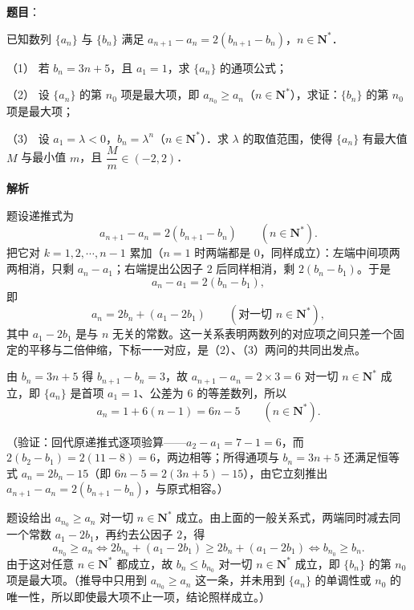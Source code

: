\begin{answer}

\textbf{题目}：

已知数列 \(\{a_{n}\}\) 与 \(\{b_{n}\}\) 满足 \(a_{n+1}-a_{n}=2(b_{n+1}-b_{n})\)，\(n\in\mathbf{N}^{*}\)．

（1） 若 \(b_{n}=3n+5\)，且 \(a_{1}=1\)，求 \(\{a_{n}\}\) 的通项公式；

（2） 设 \(\{a_{n}\}\) 的第 \(n_{0}\) 项是最大项，即 \(a_{n_{0}}\geqslant a_{n}\)（\(n\in\mathbf{N}^{*}\)），求证：\(\{b_{n}\}\) 的第 \(n_{0}\) 项是最大项；

（3） 设 \(a_{1}=\lambda<0\)，\(b_{n}=\lambda^{n}\)（\(n\in\mathbf{N}^{*}\)）．求 \(\lambda\) 的取值范围，使得 \(\{a_{n}\}\) 有最大值 \(M\) 与最小值 \(m\)，且 \(\dfrac{M}{m}\in(-2,2)\)．

\textbf{解析}

题设递推式为
\nopagebreak[4]
\[
a_{n+1}-a_{n}=2(b_{n+1}-b_{n})\qquad(n\in\mathbf{N}^{*}).
\]
把它对 \(k=1,2,\cdots,n-1\) 累加（\(n=1\) 时两端都是 \(0\)，同样成立）：左端中间项两两相消，只剩 \(a_{n}-a_{1}\)；右端提出公因子 \(2\) 后同样相消，剩 \(2(b_{n}-b_{1})\)。于是
\nopagebreak[4]
\[
a_{n}-a_{1}=2(b_{n}-b_{1}),
\]
即
\nopagebreak[4]
\[
a_{n}=2b_{n}+(a_{1}-2b_{1})\qquad(\text{对一切 }n\in\mathbf{N}^{*}),
\]
其中 \(a_{1}-2b_{1}\) 是与 \(n\) 无关的常数。这一关系表明两数列的对应项之间只差一个固定的平移与二倍伸缩，下标一一对应，是（2）、（3）两问的共同出发点。


由 \(b_{n}=3n+5\) 得 \(b_{n+1}-b_{n}=3\)，故 \(a_{n+1}-a_{n}=2\times3=6\) 对一切 \(n\in\mathbf{N}^{*}\) 成立，即 \(\{a_{n}\}\) 是首项 \(a_{1}=1\)、公差为 \(6\) 的等差数列，所以
\nopagebreak[4]
\[
a_{n}=1+6(n-1)=6n-5\qquad(n\in\mathbf{N}^{*}).
\]

（验证：回代原递推式逐项验算——\(a_{2}-a_{1}=7-1=6\)，而 \(2(b_{2}-b_{1})=2(11-8)=6\)，两边相等；所得通项与 \(b_{n}=3n+5\) 还满足恒等式 \(a_{n}=2b_{n}-15\)（即 \(6n-5=2(3n+5)-15\)），由它立刻推出 \(a_{n+1}-a_{n}=2(b_{n+1}-b_{n})\)，与原式相容。）


题设给出 \(a_{n_{0}}\geqslant a_{n}\) 对一切 \(n\in\mathbf{N}^{*}\) 成立。由上面的一般关系式，两端同时减去同一个常数 \(a_{1}-2b_{1}\)，再约去公因子 \(2\)，得
\nopagebreak[4]
\[
a_{n_{0}}\geqslant a_{n}\iff 2b_{n_{0}}+(a_{1}-2b_{1})\geqslant 2b_{n}+(a_{1}-2b_{1})\iff b_{n_{0}}\geqslant b_{n}.
\]
由于这对任意 \(n\in\mathbf{N}^{*}\) 都成立，故 \(b_{n}\leqslant b_{n_{0}}\) 对一切 \(n\in\mathbf{N}^{*}\) 成立，即 \(\{b_{n}\}\) 的第 \(n_{0}\) 项是最大项。（推导中只用到 \(a_{n_{0}}\geqslant a_{n}\) 这一条，并未用到 \(\{a_{n}\}\) 的单调性或 \(n_{0}\) 的唯一性，所以即使最大项不止一项，结论照样成立。）


\end{answer}
